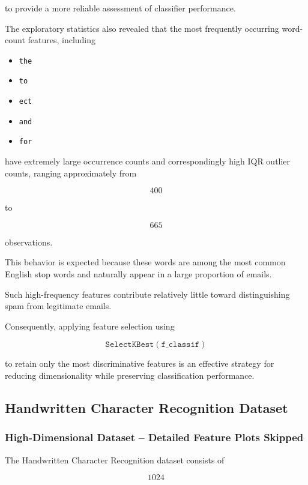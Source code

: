 \documentclass[12pt,a4paper]{article}
\begin{document}
to provide a more reliable assessment of classifier performance.

The exploratory statistics also revealed that the most frequently occurring
word-count features, including

\begin{itemize}
    \item \texttt{the}
    \item \texttt{to}
    \item \texttt{ect}
    \item \texttt{and}
    \item \texttt{for}
\end{itemize}

have extremely large occurrence counts and correspondingly high IQR outlier
counts, ranging approximately from

\[
400
\]

to

\[
665
\]

observations.

This behavior is expected because these words are among the most common
English stop words and naturally appear in a large proportion of emails.

Such high-frequency features contribute relatively little toward
distinguishing spam from legitimate emails.

Consequently, applying feature selection using

\[
\texttt{SelectKBest}(\texttt{f\_classif})
\]

to retain only the most discriminative features is an effective strategy for
reducing dimensionality while preserving classification performance.

\subsection{Handwritten Character Recognition Dataset}
\label{subsec:handwritten_characters}

\subsubsection*{High-Dimensional Dataset -- Detailed Feature Plots Skipped}

The Handwritten Character Recognition dataset consists of

\[
1024
\]
\end{document}
